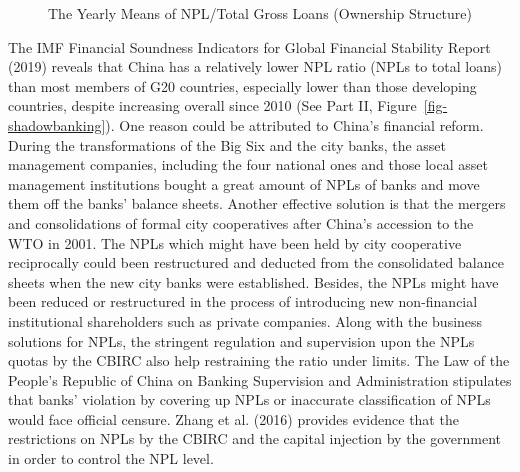 \documentclass[
  12pt,
  a4paper,
]{scrreprt}
\begin{document}
{{{{\begin{figure}
{}

\caption{\label{fig-NPL}The Yearly Means of NPL/Total Gross Loans
(Ownership Structure)}

\end{figure}%

The IMF Financial Soundness Indicators for Global Financial Stability
Report (2019) reveals that China has a relatively lower NPL ratio (NPLs
to total loans) than most members of G20 countries, especially lower
than those developing countries, despite increasing overall since 2010
(See Part II, Figure~\ref{fig-shadowbanking}). One reason could be
attributed to China's financial reform. During the transformations of
the Big Six and the city banks, the asset management companies,
including the four national ones and those local asset management
institutions bought a great amount of NPLs of banks and move them off
the banks' balance sheets. Another effective solution is that the
mergers and consolidations of formal city cooperatives after China's
accession to the WTO in 2001. The NPLs which might have been held by
city cooperative reciprocally could been restructured and deducted from
the consolidated balance sheets when the new city banks were
established. Besides, the NPLs might have been reduced or restructured
in the process of introducing new non-financial institutional
shareholders such as private companies. Along with the business
solutions for NPLs, the stringent regulation and supervision upon the
NPLs quotas by the CBIRC also help restraining the ratio under limits.
The Law of the People's Republic of China on Banking Supervision and
Administration stipulates that banks' violation by covering up NPLs or
inaccurate classification of NPLs would face official censure. Zhang et
al. (2016) provides evidence that the restrictions on NPLs by the CBIRC
and the capital injection by the government in order to control the NPL
level.

\begin{figure}

\end{figure}}}}}
\end{document}
